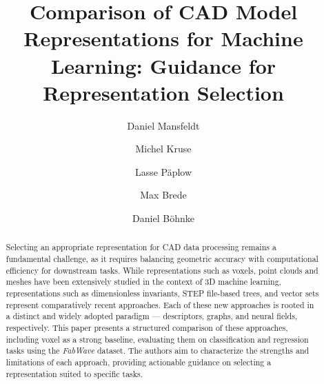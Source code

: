 \documentclass[5p,times,procedia]{elsarticle}
\begin{document}
\begin{frontmatter}



%

\title{Comparison of CAD Model Representations for Machine Learning: Guidance for Representation Selection}




\author[a,b]{Daniel Mansfeldt} 
\author[a,b]{Michel Kruse}
\author[a,b]{Lasse Päplow}
\author[a]{Max Brede}
\author[b]{Daniel Böhnke}

\address[a]{F\&E GmbH, Schwentinestr. 24, 24149 Kiel, Germany}
\address[b]{Institut für Produktionstechnik und CIMTT der HAW Kiel, Schwentinestr. 13, 24149 Kiel, Germany}


\begin{abstract}
Selecting an appropriate representation for CAD data processing remains a fundamental challenge, as it requires balancing geometric accuracy with computational efficiency for downstream tasks.
While representations such as voxels, point clouds and meshes have been extensively studied in the context of 3D machine learning, representations such as dimensionless invariants, STEP file-based trees, and vector sets represent comparatively recent approaches.
Each of these new approaches is rooted in a distinct and widely adopted paradigm — descriptors, graphs, and neural fields, respectively.
This paper presents a structured comparison of these approaches, including voxel as a strong baseline, evaluating them on classification and regression tasks using the \textit{FabWave} dataset.
The authors aim to characterize the strengths and limitations of each approach, providing actionable guidance on selecting a representation suited to specific tasks.
\end{abstract}


\end{frontmatter}
\end{document}
